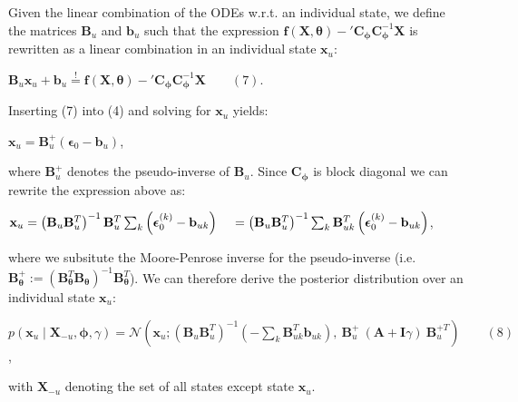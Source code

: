 \begin{par}
Given the linear combination of the ODEs w.r.t. an individual state, we define the matrices $\mathbf{B}_u$ and $\mathbf{b}_u$ such that the expression $\mathbf{f}(\mathbf{X},\boldsymbol\theta) - {'\mathbf{C}}_{\boldsymbol\phi}\mathbf{C}_{\boldsymbol\phi}^{-1} \mathbf{X}$ is rewritten as a linear combination in an individual state $\mathbf{x}_u$:
\end{par} \vspace{1em}
\begin{par}
$\mathbf{B}_{u} \mathbf{x}_u + \mathbf{b}_{u} \stackrel{!}{=}\mathbf{f}(\mathbf{X},\boldsymbol\theta) - {'\mathbf{C}}_{\boldsymbol\phi}\mathbf{C}_{\boldsymbol\phi}^{-1} \mathbf{X} \qquad (7)$.
\end{par} \vspace{1em}
\begin{par}
Inserting (7) into (4) and solving for $\mathbf{x}_u$ yields:
\end{par} \vspace{1em}
\begin{par}
$\mathbf{x}_u = \mathbf{B}_{u}^+ \left( \boldsymbol{\epsilon}_0 -\mathbf{b}_{u}\right)$,
\end{par} \vspace{1em}
\begin{par}
where $\mathbf{B}_{u}^+$ denotes the pseudo-inverse of $\mathbf{B}_{u}$. Since $\mathbf{C}_{\boldsymbol\phi}$ is block diagonal we can rewrite the expression above as:
\end{par} \vspace{1em}
\begin{par}
$\mathbf{x}_u = \left( \mathbf{B}_{u} \mathbf{B}_{u}^T \right)^{-1}\mathbf{B}_{u}^T \sum_k \left(\boldsymbol{\epsilon}_0^{(k)} -\mathbf{b}_{uk} \right)\\ \quad= \left( \mathbf{B}_{u} \mathbf{B}_{u}^T \right)^{-1} \sum_k\mathbf{B}_{uk}^T \left(\boldsymbol{\epsilon}_0^{(k)} -\mathbf{b}_{uk} \right)$,
\end{par} \vspace{1em}
\begin{par}
where we subsitute the Moore-Penrose inverse for the pseudo-inverse (i.e. $\mathbf{B}_{\boldsymbol\theta}^+ := \left( \mathbf{B}_{\boldsymbol\theta}^T \mathbf{B}_{\boldsymbol\theta}\right)^{-1} \mathbf{B}_{\boldsymbol\theta}^T$).  We can therefore derive the posterior distribution over an individual state $\mathbf{x}_{u}$:
\end{par} \vspace{1em}
\begin{par}
$p(\mathbf{x}_u \mid \mathbf{X}_{-u}, \boldsymbol\phi, \gamma)= \mathcal{N}\left(\mathbf{x}_u ; \left( \mathbf{B}_{u} \mathbf{B}_{u}^T\right)^{-1} \left( - \sum_k \mathbf{B}_{uk}^T \mathbf{b}_{uk} \right),~\mathbf{B}_{u}^{+} ~ (\mathbf{A} + \mathbf{I}\gamma) ~ \mathbf{B}_u^{+T}\right) \qquad (8)$,
\end{par} \vspace{1em}
\begin{par}
with $\mathbf{X}_{-u}$ denoting the set of all states except state $\mathbf{x}_u$.
\end{par} \vspace{1em}


